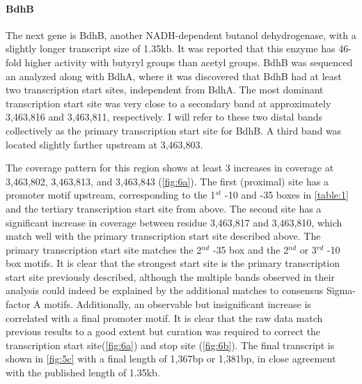 \paragraph{BdhB}
The next gene is BdhB, another NADH-dependent butanol dehydrogenase, with a slightly longer transcript size of 1.35kb. It was reported that this enzyme has 46-fold higher activity with butyryl groups than acetyl groups\cite{71,73}. BdhB was sequenced an analyzed along with BdhA, where it was discovered that BdhB had at least two transcription start sites, independent from BdhA. The most dominant transcription start site was very close to a secondary band at approximately 3,463,816 and 3,463,811, respectively\cite{73}. I will refer to these two distal bands collectively as the primary transcription start site for BdhB. A third band was located slightly farther upstream at 3,463,803\cite{73}. 

The coverage pattern for this region shows at least 3 increases in coverage at 3,463,802, 3,463,813, and 3,463,843 (\ref{fig:6a}). The first (proximal) site has a promoter motif upstream, corresponding to the 1$^{st}$ -10 and -35 boxes in \ref{table:1} and the tertiary transcription start site from above\cite{72}. The second site has a significant increase in coverage between residue 3,463,817 and 3,463,810, which match well with the primary transcription start site described above\cite{73}. The primary transcription start site matches the 2$^{nd}$  -35 box and the 2$^{nd}$ or 3$^{rd}$ -10 box motifs\cite{73}. It is clear that the strongest start site is the primary transcription start site previously described\cite{73}, although the multiple bands observed in their analysis could indeed be explained by the additional matches to consensus Sigma-factor A motifs. Additionally, an observable but insignificant increase is correlated with a final promoter motif. It is clear that the raw data match previous results to a good extent but curation was required to correct the transcription start site(\ref{fig:6a}) and stop site (\ref{fig:6b}). The final transcript is shown in \ref{fig:5c} with a final length of 1,367bp or 1,381bp, in close agreement with the published length of 1.35kb.


